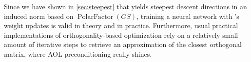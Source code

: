 Since we have shown in \cref{sec:steepest} that \turbomuon yields steepest descent
directions in an induced norm based on $\operatorname{PolarFactor}(GS)$, 
training a neural network with \turbomuon's weight updates is valid in theory and in practice. Furthermore, usual practical implementations of orthogonality-based optimization rely on a relatively small amount of iterative steps to retrieve an approximation of the closest orthogonal matrix, where AOL preconditioning really shines.

